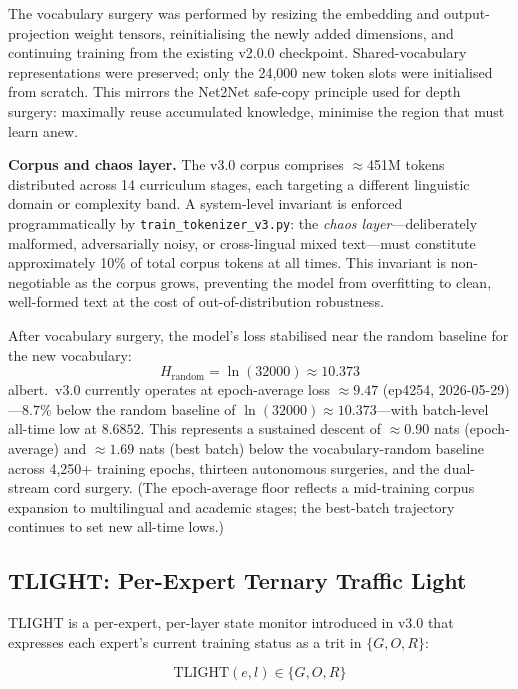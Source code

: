 \documentclass[11pt,a4paper]{article}
\begin{document}
The vocabulary surgery was performed by resizing the embedding and output-projection
weight tensors, reinitialising the newly added dimensions, and continuing training
from the existing v2.0.0 checkpoint. Shared-vocabulary representations were
preserved; only the 24,000 new token slots were initialised from scratch. This
mirrors the Net2Net safe-copy principle used for depth surgery: maximally reuse
accumulated knowledge, minimise the region that must learn anew.

\textbf{Corpus and chaos layer.} The v3.0 corpus comprises $\approx$451M tokens
distributed across 14 curriculum stages, each targeting a different linguistic
domain or complexity band. A system-level invariant is enforced programmatically
by \texttt{train\_tokenizer\_v3.py}: the \emph{chaos layer}---deliberately
malformed, adversarially noisy, or cross-lingual mixed text---must constitute
approximately 10\% of total corpus tokens at all times. This invariant is
non-negotiable as the corpus grows, preventing the model from overfitting to
clean, well-formed text at the cost of out-of-distribution robustness.

After vocabulary surgery, the model's loss stabilised near the random baseline for
the new vocabulary:
\begin{equation}
  H_{\text{random}} = \ln(32000) \approx 10.373
\end{equation}
albert.\ v3.0 currently operates at epoch-average loss $\mathbf{\approx 9.47}$ (ep4254,
2026-05-29)---$8.7\%$ below the random baseline of $\ln(32000) \approx 10.373$---with
batch-level all-time low at $\mathbf{8.6852}$. This represents a sustained descent of
$\approx 0.90$ nats (epoch-average) and $\approx 1.69$ nats (best batch) below the
vocabulary-random baseline across 4{,}250+ training epochs, thirteen autonomous
surgeries, and the dual-stream cord surgery. (The epoch-average floor reflects a
mid-training corpus expansion to multilingual and academic stages; the best-batch
trajectory continues to set new all-time lows.)

\subsection{TLIGHT: Per-Expert Ternary Traffic Light}
\label{subsec:tlight}

TLIGHT is a per-expert, per-layer state monitor introduced in v3.0 that expresses
each expert's current training status as a trit in $\{G, O, R\}$:

\begin{equation}
  \text{TLIGHT}(e, l) \in \{G, O, R\}
  \label{eq:tlight}
\end{equation}
\end{document}
